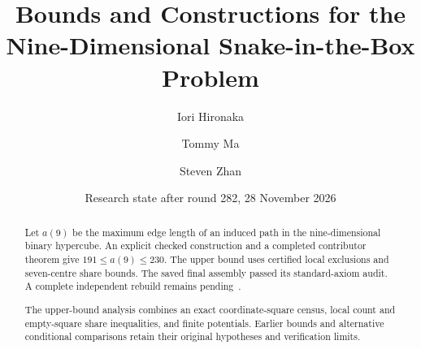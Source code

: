 \documentclass[11pt,a4paper]{article}
\title{Bounds and Constructions for the\\
Nine-Dimensional Snake-in-the-Box Problem}
\author{Iori Hironaka \and Tommy Ma \and Steven Zhan}
\date{Research state after round 282, 28 November 2026}
\theoremstyle{definition}
\theoremstyle{remark}
\begin{document}
\hypersetup{pageanchor=false}
\maketitle
\begin{abstract}
Let $a(9)$ be the maximum edge length of an induced path in the
nine-dimensional binary hypercube. An explicit checked construction and
a completed contributor theorem give $191\le a(9)\le230$. The upper
bound uses certified local exclusions and seven-centre share bounds.
The saved final assembly passed its standard-axiom audit. A complete
independent rebuild remains pending~\cite{bound230archive}.

The upper-bound analysis combines an exact coordinate-square census,
local count and empty-square share inequalities, and finite potentials.
Earlier bounds and alternative conditional comparisons retain their
original hypotheses and verification limits.


\end{abstract}
\end{document}
